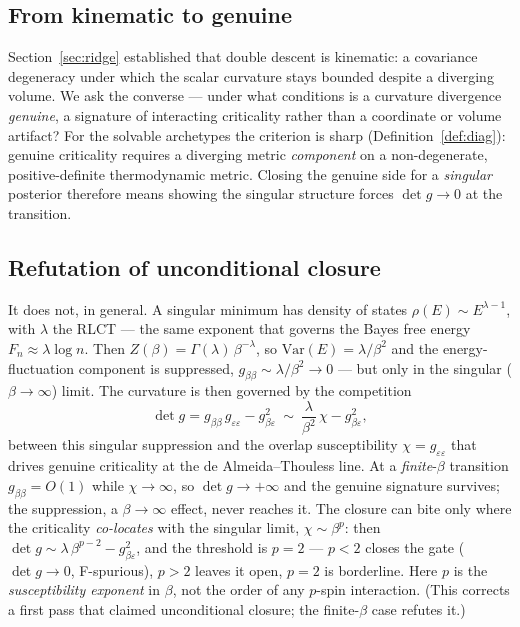 \documentclass[a4paper,11pt]{article}
\theoremstyle{plain}
\theoremstyle{definition}
\theoremstyle{remark}
\newcommand{\eps}{\varepsilon}
\newcommand{\detg}{\det g}
\begin{document}
\subsection{From kinematic to genuine}\label{sec:gate-criterion}
Section~\ref{sec:ridge} established that double descent is kinematic: a covariance degeneracy under which the
scalar curvature stays bounded despite a diverging volume. We ask the converse --- under what conditions is a
curvature divergence \emph{genuine}, a signature of interacting criticality rather than a coordinate or
volume artifact? For the solvable archetypes the criterion is sharp (Definition~\ref{def:diag}): genuine
criticality requires a diverging metric \emph{component} on a non-degenerate, positive-definite thermodynamic
metric. Closing the genuine side for a \emph{singular} posterior therefore means showing the singular
structure forces $\detg\to0$ at the transition.

\subsection{Refutation of unconditional closure}\label{sec:gate-race}
It does not, in general. A singular minimum has density of states $\rho(E)\sim E^{\lambda-1}$, with $\lambda$
the RLCT --- the same exponent that governs the Bayes free energy $F_n\approx\lambda\log n$. Then
$Z(\beta)=\Gamma(\lambda)\,\beta^{-\lambda}$, so $\mathrm{Var}(E)=\lambda/\beta^2$ and the energy-fluctuation
component is suppressed, $g_{\beta\beta}\sim\lambda/\beta^2\to0$ --- but only in the singular
($\beta\to\infty$) limit. The curvature is then governed by the competition
\begin{equation}
\detg=g_{\beta\beta}\,g_{\eps\eps}-g_{\beta\eps}^2\ \sim\ \frac{\lambda}{\beta^2}\,\chi-g_{\beta\eps}^2,
\label{eq:detg-race}
\end{equation}
between this singular suppression and the overlap susceptibility $\chi=g_{\eps\eps}$ that drives genuine
criticality at the de Almeida--Thouless line. At a \emph{finite}-$\beta$ transition $g_{\beta\beta}=O(1)$
while $\chi\to\infty$, so $\detg\to+\infty$ and the genuine signature survives; the suppression, a
$\beta\to\infty$ effect, never reaches it. The closure can bite only where the criticality \emph{co-locates}
with the singular limit, $\chi\sim\beta^{p}$: then $\detg\sim\lambda\,\beta^{p-2}-g_{\beta\eps}^2$, and the
threshold is $p=2$ --- $p<2$ closes the gate ($\detg\to0$, F-spurious), $p>2$ leaves it open, $p=2$ is
borderline. Here $p$ is the \emph{susceptibility exponent} in $\beta$, not the order of any $p$-spin
interaction. (This corrects a first pass that claimed unconditional closure; the finite-$\beta$ case refutes
it.)
\end{document}
